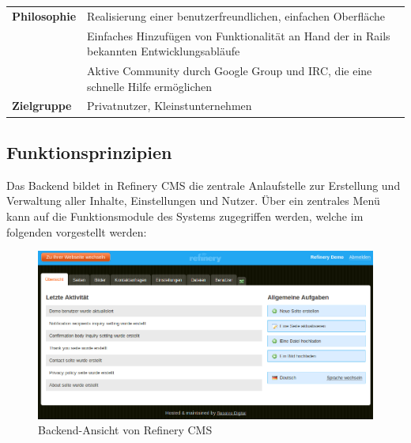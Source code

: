 \begin{table}[!h]
\begin{tabular}[!ht]{|l|l|l|}
\hline
\textbf{Philosophie} & \multicolumn{2}{p{10cm}|}{Realisierung einer benutzerfreundlichen, einfachen Oberfläche} \\
& \multicolumn{2}{p{10cm}|}{Einfaches Hinzufügen von Funktionalität an Hand der in Rails bekannten Entwicklungsabläufe}\\
& \multicolumn{2}{p{10cm}|}{Aktive Community durch Google Group und IRC, die eine schnelle Hilfe ermöglichen}\\
\hline
\textbf{Zielgruppe} & \multicolumn{2}{p{10cm}|}{Privatnutzer, Kleinstunternehmen} \\
\hline
\end{tabular}
\end{table}
\subsection{Funktionsprinzipien}
Das Backend bildet in Refinery CMS die zentrale Anlaufstelle zur Erstellung und Verwaltung aller Inhalte, Einstellungen und Nutzer. Über ein zentrales Menü kann auf die Funktionsmodule des Systems zugegriffen werden, welche im folgenden vorgestellt werden:
\begin{figure}[!h]
\begin{center}
\includegraphics[scale=0.43]{images/analyse/refinery/backendrefinery.png}
\caption{Backend-Ansicht von Refinery CMS}
\label{refinerybackend}
\end{center}
\end{figure}


